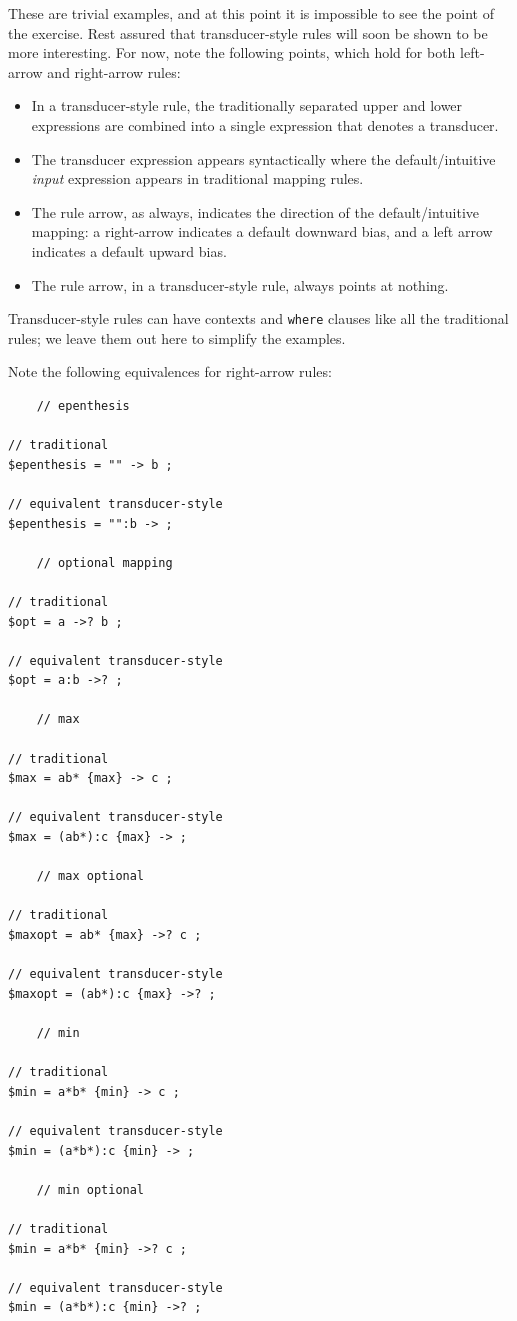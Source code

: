 These are trivial examples, and at this point it is impossible to see the point of the exercise.  Rest
assured that transducer-style rules will soon be shown to be more interesting.  For now, note the
following points, which hold for both left-arrow and right-arrow rules:

\begin{itemize}
	\item
In a transducer-style rule, the traditionally separated upper and lower expressions are combined into a single expression
that denotes a transducer.
\item
	The transducer expression appears syntactically where the default/intuitive \emph{input} expression appears in
	traditional mapping rules.
\item
	The rule arrow, as always, indicates the direction of the default/intuitive mapping:  a right-arrow
	indicates a default downward bias, and a left arrow indicates a default upward
	bias.
\item
The rule arrow, in a transducer-style rule, always points at nothing.
\end{itemize}

\noindent
Transducer-style rules can have contexts and \texttt{where} clauses like all the traditional rules; we
leave them out here to simplify the examples.

Note the following equivalences for right-arrow rules:

\begin{Verbatim}
	// epenthesis

// traditional
$epenthesis = "" -> b ;

// equivalent transducer-style
$epenthesis = "":b -> ;

	// optional mapping

// traditional
$opt = a ->? b ;

// equivalent transducer-style
$opt = a:b ->? ;

	// max 

// traditional
$max = ab* {max} -> c ;

// equivalent transducer-style
$max = (ab*):c {max} -> ;

	// max optional

// traditional
$maxopt = ab* {max} ->? c ;

// equivalent transducer-style
$maxopt = (ab*):c {max} ->? ;

	// min

// traditional
$min = a*b* {min} -> c ;

// equivalent transducer-style
$min = (a*b*):c {min} -> ;

	// min optional

// traditional
$min = a*b* {min} ->? c ;

// equivalent transducer-style
$min = (a*b*):c {min} ->? ;
\end{Verbatim}

